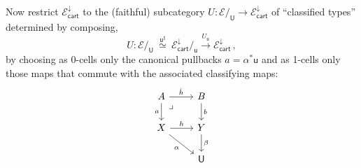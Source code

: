 \documentclass[12pt,reqno]{amsart}
\newcommand{\EE}{\ensuremath{\mathcal{E}}}
\newcommand{\hook}{\ensuremath{\hookrightarrow}}
\renewcommand{\to}{\ensuremath{\rightarrow}}
\newcommand{\too}{\ensuremath{\longrightarrow}}
\renewcommand{\t}{\ensuremath{\mathsf{u}}}
\newcommand{\T}{\ensuremath{\mathsf{U}}}
\newcommand{\TT}{\ensuremath{\dot{\mathsf{U}}}}
\newcommand{\pbcorner}{\arrow[dr,phantom,"\lrcorner" very near start, shift right=.5ex]} %
\newtheorem{proposition}[theorem]{Proposition}
\theoremstyle{remark}
\theoremstyle{definition}
\begin{document}
Now restrict $\EE^{\downarrow}_{\mathsf{cart}}$ to the (faithful) subcategory $U : \EE/_\T \to \EE^{\downarrow}_{\mathsf{cart}}$ of ``classified types'' determined by composing,
\begin{equation}\label{eq:faithfulU}
U : \EE/_\T\ \stackrel{\t^{\sharp}}{\simeq}\ \EE^{\downarrow}_{\mathsf{cart}} /_\t \stackrel{U_\t}{\too} \EE^{\downarrow}_{\mathsf{cart}}\,,
\end{equation}
by choosing as 0-cells only the canonical  pullbacks $a = \alpha^{*}\t$ and as 1-cells only those maps that commute with the associated classifying maps:
\begin{equation}\label{diag:classified1cells}
\begin{tikzcd}
A \ar[d,swap, "a"] \ar[r, "{\dot{h}}"] \pbcorner & B \ar[d, "b"] \\
X \ar[r,swap,swap, "{h}"] \ar[rd,swap, "\alpha"] &  Y \ar[d, "\beta"]\\
& \T
\end{tikzcd}
\end{equation}
%
%
\end{document}
